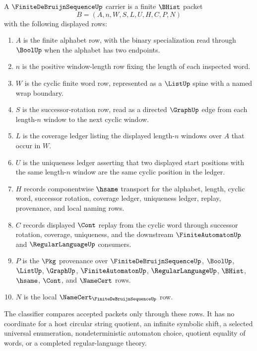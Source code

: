 \begin{definition}
\label{def:finite-de-bruijn-sequence-carrier}
A $\FiniteDeBruijnSequenceUp$ carrier is a finite $\BHist$ packet
$$
B=(A,n,W,S,L,U,H,C,P,N)
$$
with the following displayed rows:
\begin{enumerate}
\item $A$ is the finite alphabet row, with the binary specialization read through $\BoolUp$ when the alphabet has two endpoints.
\item $n$ is the positive window-length row fixing the length of each inspected word.
\item $W$ is the cyclic finite word row, represented as a $\ListUp$ spine with a named wrap boundary.
\item $S$ is the successor-rotation row, read as a directed $\GraphUp$ edge from each length-$n$ window to the next cyclic window.
\item $L$ is the coverage ledger listing the displayed length-$n$ windows over $A$ that occur in $W$.
\item $U$ is the uniqueness ledger asserting that two displayed start positions with the same length-$n$ window are the same cyclic position in the ledger.
\item $H$ records componentwise $\hsame$ transport for the alphabet, length, cyclic word, successor rotation, coverage ledger, uniqueness ledger, replay, provenance, and local naming rows.
\item $C$ records displayed $\Cont$ replay from the cyclic word through successor rotation, coverage, uniqueness, and the downstream $\FiniteAutomatonUp$ and $\RegularLanguageUp$ consumers.
\item $P$ is the $\Pkg$ provenance over $\FiniteDeBruijnSequenceUp$, $\BoolUp$, $\ListUp$, $\GraphUp$, $\FiniteAutomatonUp$, $\RegularLanguageUp$, $\BHist$, $\hsame$, $\Cont$, and $\NameCert$ rows.
\item $N$ is the local $\NameCert_{\FiniteDeBruijnSequenceUp}$ row.
\end{enumerate}
The classifier compares accepted packets only through these rows. It has no coordinate for a host circular string quotient, an infinite symbolic shift, a selected universal enumeration, nondeterministic automaton choice, quotient equality of words, or a completed regular-language theory.
\end{definition}

